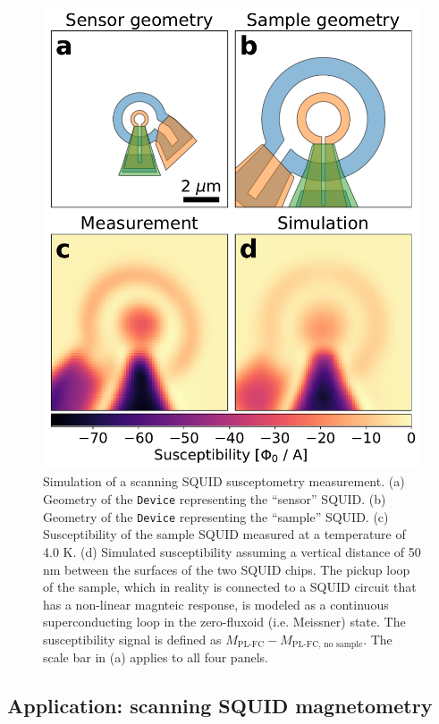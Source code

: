 \documentclass[final,3p,times,twocolumn]{elsarticle}
\newcommand{\inline}[1]{\texttt{#1}\xspace}
\begin{document}
\begin{figure}[t]
    \centering
    \includegraphics[width=\linewidth]{examples/images/squid-susc-simulation.pdf}
    \caption{Simulation of a scanning SQUID susceptometry measurement. (a) Geometry of the \inline{Device} representing the ``sensor'' SQUID. (b) Geometry of the \inline{Device} representing the ``sample'' SQUID. (c) Susceptibility of the sample SQUID measured at a temperature of 4.0 K. (d) Simulated susceptibility assuming a vertical distance of 50 nm between the surfaces of the two SQUID chips. The pickup loop of the sample, which in reality is connected to a SQUID circuit that has a non-linear magnteic response, is modeled as a continuous superconducting loop in the zero-fluxoid (i.e. Meissner) state. The susceptibility signal is defined as $M_\text{PL-FC} - M_\text{PL-FC, no sample}$. The scale bar in (a) applies to all four panels.}
    \label{fig:squid-susc}
\end{figure}

\subsection{Application: scanning SQUID magnetometry}
\label{section:examples:magnetometry}
\end{document}
